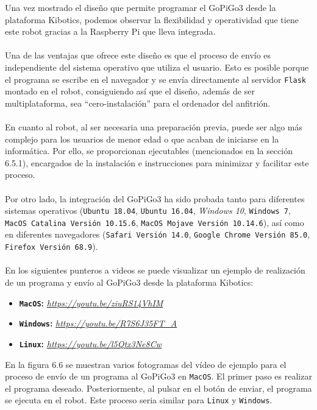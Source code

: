 \documentclass{report}
\begin{document}
Una vez mostrado el diseño que permite programar el GoPiGo3 desde la plataforma Kibotics, podemos observar la flexibilidad y operatividad que tiene este robot gracias a la Raspberry Pi que lleva integrada.
\\
\\
Una de las ventajas que ofrece este diseño es que el proceso de envío es independiente del sistema operativo que utiliza el usuario. Esto es posible porque el programa se escribe en el navegador y se envía directamente al servidor \texttt{Flask} montado en el robot, consiguiendo así que el diseño, además de ser multiplataforma, sea “cero-instalación” para el ordenador del anfitrión.
\\
\\
En cuanto al robot, al ser necesaria una preparación previa, puede ser algo más complejo para los usuarios de menor edad o que acaban de iniciarse en la informática. Por ello, se proporcionan ejecutables (mencionados en la sección 6.5.1), encargados de la instalación e instrucciones para minimizar y facilitar este proceso.
\\
\\
Por otro lado, la integración del GoPiGo3 ha sido probada tanto para diferentes sistemas operativos (\texttt{Ubuntu 18.04}, \texttt{Ubuntu 16.04}, \textit{Windows 10}, \texttt{Windows 7}, \texttt{MacOS Catalina Versión 10.15.6}, \texttt{MacOS Mojave Versión 10.14.6}), así como en diferentes navegadores (\texttt{Safari Versión 14.0}, \texttt{Google Chrome Versión 85.0}, \texttt{Firefox Versión 68.9}).
\\
\\
En los siguientes punteros a videos se puede visualizar un ejemplo de realización de un programa y envío al GoPiGo3 desde la plataforma Kibotics:
\begin{itemize}
	\item \textbf{\texttt{MacOS}:} \textit{\url{https://youtu.be/ziuRS14VhIM}}
	\item \textbf{\texttt{Windows}:}  \textit{\url{https://youtu.be/R7S6J35FT\_A}}
	\item \textbf{\texttt{Linux}:}  \textit{\url{https://youtu.be/l5Qtx3Ne8Cw}}
\end{itemize}
En la figura 6.6 se muestran varios fotogramas del vídeo de ejemplo para el proceso de envío de un programa al GoPiGo3 en \texttt{MacOS}. El primer  paso es realizar el programa deseado. Posteriormente, al pulsar en el botón de enviar, el programa se ejecuta en el robot. Este proceso seria similar para \texttt{Linux} y \texttt{Windows}.
\end{document}
